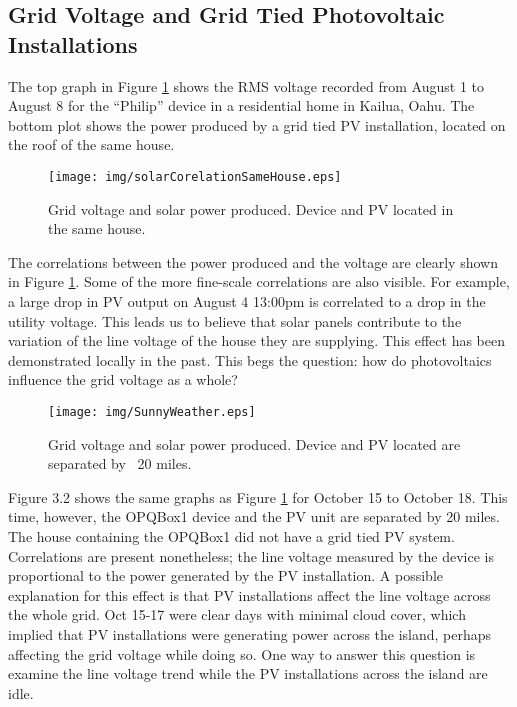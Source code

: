 \subsection{Grid Voltage and Grid Tied Photovoltaic Installations}
\label{sub:PV}
The top graph in Figure \ref{fig:samehouse} shows the RMS voltage recorded from August 1 to August 8 for the ``Philip'' device in a residential home in Kailua, Oahu. The bottom plot shows the power produced by 
a grid tied PV installation, located on the roof of the same house.

\begin{figure}[h!]
\centering
\texttt{[image: img/solarCorelationSameHouse.eps]}
\caption{Grid voltage and solar power produced. Device and PV located in the same house.}
\label{fig:samehouse}
\end{figure}

The correlations between the power produced and the voltage are clearly shown in Figure  \ref{fig:samehouse}. Some of the more fine-scale correlations are also visible. 
For example, a large drop in PV output on August 4 13:00pm is correlated to a drop in the utility voltage. This leads us to believe that solar panels contribute to the
variation of the line voltage of the house they are supplying. This effect has been demonstrated locally in the past.\cite{pq_effect1} This begs the question: how do photovoltaics influence the grid voltage as a whole?

\begin{figure}[h!]
\centering
\texttt{[image: img/SunnyWeather.eps]}
\caption{Grid voltage and solar power produced. Device and PV located are separated by ~20 miles.}
\label{fig:diffhouse}
\end{figure} 

Figure 3.2 shows the same graphs as Figure \ref{fig:samehouse} for October 15 to October 18. This time, however, the OPQBox1 device and the PV unit are separated by 20 miles. The house containing the OPQBox1 did not have a grid tied PV system. Correlations are present nonetheless; the line voltage measured by the device is proportional to the power generated by the PV installation. A possible explanation for this effect is that PV installations affect the line voltage across the whole grid. Oct 15-17 were clear days with minimal cloud cover, which implied that PV installations were generating power across the island, perhaps affecting the grid voltage while doing so. One way to answer this question is examine the line voltage trend while the PV installations
across the island are idle. 

